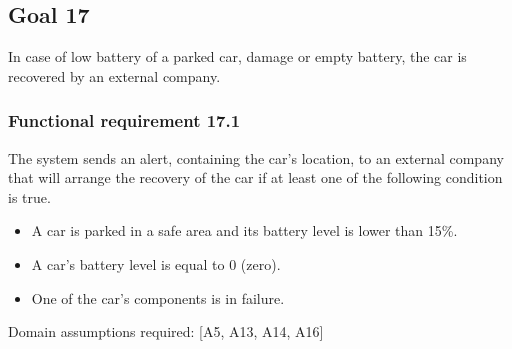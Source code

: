 \subsection{Goal 17}
In case of low battery of a parked car, damage or empty battery, the car is recovered by an external company. 

\setcounter{secnumdepth}{3}
\subsubsection{Functional requirement 17.1}
The system sends an alert, containing the car's location, to an external company that will arrange the recovery of the car if at least one of the following condition is true.

\begin{itemize}
	\item A car is parked in a safe area and its battery level is lower than 15\%.
	\item A car's battery level is equal to 0 (zero).
	\item One of the car's components is in failure.
\end{itemize}

\noindent Domain assumptions required: [A5, A13, A14, A16]
